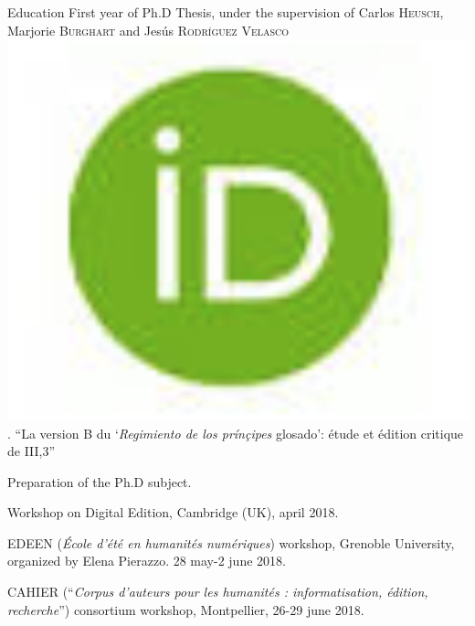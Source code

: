  \begin{rubric}{Education}
                                \entry*[2018-2019]
                            First year of Ph.D Thesis, under the supervision of Carlos
                        \textsc{Heusch}, Marjorie \textsc{Burghart} and
                        Jesús \textsc{Rodríguez Velasco}\href{https://orcid.org/0000-0002-3848-9230}{\includegraphics[scale=0.025]{../img/orcid.png}}.
                        \enquote{La version B du \enquote{\textit{Regimiento de los prínçipes}
                        glosado}: étude et édition critique de III,3}
                    
                                \entry*[2017-2018]
                            Preparation of the Ph.D subject.
                    
                                \entry*
                            Workshop on Digital Edition, Cambridge (UK), april 2018.
                    
                                 EDEEN (\textit{École d'été en humanités numériques}) workshop,
                        Grenoble University, organized by Elena Pierazzo. 28 may-2 june
                        2018.
                    
                                 CAHIER (\enquote{\textit{Corpus d’auteurs pour les humanités :
                        informatisation, édition, recherche}}) consortium workshop,
                        Montpellier, 26-29 june 2018.
                    

\end{rubric}
